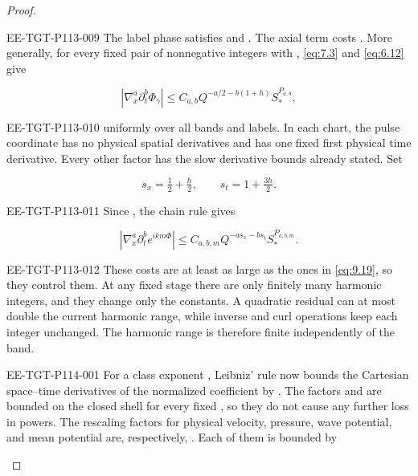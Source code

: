\begin{proof}
\begin{EESegment}{EE-TGT-P113-009}
The label phase satisfies
 and
. The axial term
 costs
. More generally, for every fixed pair of
nonnegative integers  with ,
\eqref{eq:7.3} and \eqref{eq:6.12} give
\end{EESegment}
\[
|\nabla_x^a\partial_t^b\Phi_\gamma|
 \le C_{a,b}Q^{-a/2-b(1+h)}S_*^{P_{a,b}},
\]
\begin{EESegment}{EE-TGT-P113-010}
uniformly over all bands and labels. In each chart, the pulse coordinate has no physical spatial
derivatives and has one fixed first physical time derivative. Every other factor has the slow
derivative bounds already stated. Set
\end{EESegment}
\[
s_x=\tfrac12+\tfrac h2,
\qquad
s_t=1+\tfrac{3h}{2}.
\]
\begin{EESegment}{EE-TGT-P113-011}
Since , the chain rule gives
\end{EESegment}
\[
|\nabla_x^a\partial_t^b e^{ikm\Phi}|
 \le C_{a,b,m}Q^{-as_x-bs_t}S_*^{P_{a,b,m}}.
\]
\begin{EESegment}{EE-TGT-P113-012}
These costs are at least as large as the ones in \eqref{eq:9.19}, so they control them. At any fixed
stage there are only finitely many harmonic integers, and they change only the constants. A
quadratic residual can at most double the current harmonic range, while inverse and curl operations
keep each integer unchanged. The harmonic range is therefore finite independently of the band.
\end{EESegment}
%
\begin{EESegment}{EE-TGT-P114-001}
For a class exponent , Leibniz' rule now bounds the Cartesian
space--time derivatives of the normalized coefficient by
. The factors
 and
 are bounded on the closed shell for every fixed
, so they do not cause any further loss in powers. The rescaling factors
for physical velocity, pressure, wave potential, and mean potential are, respectively,
. Each of them is bounded by

\end{EESegment}
\end{proof}
